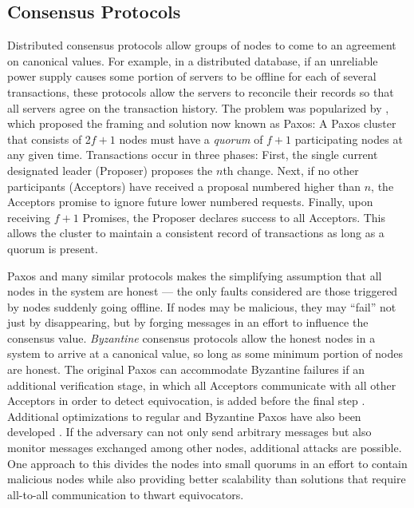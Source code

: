   \subsection{Consensus Protocols}
    Distributed consensus protocols allow groups of nodes to come to an
    agreement on canonical values. For example, in a distributed database, if an
    unreliable power supply causes some portion of servers to be offline for
    each of several transactions, these protocols allow the
    servers to reconcile their records so that all servers agree on the
    transaction history. The problem was popularized by
    \cite{lamport_part-time_1998}, which proposed the framing and solution now
    known as Paxos: A Paxos cluster that consists of 2$f+1$ nodes must have a
    \emph{quorum} of $f + 1$ participating nodes at any given time.
    Transactions occur in three phases: First, the single current designated
    leader (Proposer) proposes the $n$th change. Next, if no other participants
    (Acceptors) have received a proposal numbered higher than $n$, the Acceptors
    promise to ignore future lower numbered requests.  Finally, upon receiving
    $f+1$ Promises, the Proposer declares success to all Acceptors. This allows
    the cluster to maintain a consistent record of transactions as long as a
    quorum is present.

    Paxos and many similar protocols makes the simplifying assumption that all
    nodes in the system are honest --- the only faults considered are those
    triggered by nodes suddenly going offline. If nodes may be malicious, they
    may ``fail'' not just by disappearing, but by forging messages in an effort
    to influence the consensus value. \emph{Byzantine} consensus protocols allow
    the honest nodes in a system to arrive at a canonical value, so long as some
    minimum portion of nodes are honest. The original Paxos can
    accommodate Byzantine failures if an additional verification stage, in which
    all Acceptors communicate with all other Acceptors in order to detect
    equivocation, is added before the final step \cite{castro_practical_1999}.
    Additional optimizations to regular and Byzantine Paxos have also been
    developed \cite{lamport_fast_2006}. If the adversary can not only send
    arbitrary messages but also monitor messages exchanged among other nodes,
    additional attacks are possible. One approach to this divides the nodes into
    small quorums in an effort to contain malicious nodes \cite{king_load_2011}
    while also providing better scalability than solutions that require
    all-to-all communication to thwart equivocators.


